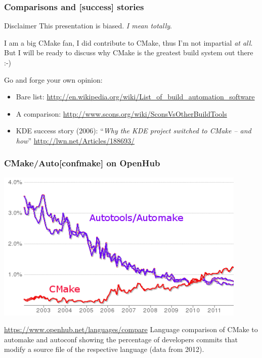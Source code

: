 \documentclass[compress,slidestop,table,usepdftitle=false
              ]
               {beamer}
\begin{document}
\begin{frame}
\frametitle{Comparisons and [success] stories}

\begin{alertblock}{Disclaimer}
This presentation is biased. \emph{I mean totally}.

I am a big CMake fan, I did contribute to CMake, thus I'm not
impartial \emph{at all}. But I will be ready to discuss why CMake
is the greatest build system out there :-)
\end{alertblock}

Go and forge your own opinion:
\begin{itemize}
\item Bare list: \url{http://en.wikipedia.org/wiki/List_of_build_automation_software}
\item A comparison: \url{http://www.scons.org/wiki/SconsVsOtherBuildTools}
\item KDE success story (2006): ``\textsl{Why the KDE project switched to CMake -- and how}''
     \url{http://lwn.net/Articles/188693/}
\end{itemize}
\end{frame}

\begin{frame}
\frametitle{CMake/Auto[conf\textbar make] on OpenHub}
\begin{center}
\includegraphics[width=0.9\textwidth,height=0.50\textheight]{compare_cmake_autotools_ohlo_color_transparent}
\end{center}
\begin{block}{\url{https://www.openhub.net/languages/compare}}
Language comparison of CMake to automake and
autoconf showing the percentage of developers commits that modify a
source file of the respective language (data from 2012).
\end{block}
\end{frame}
\end{document}
